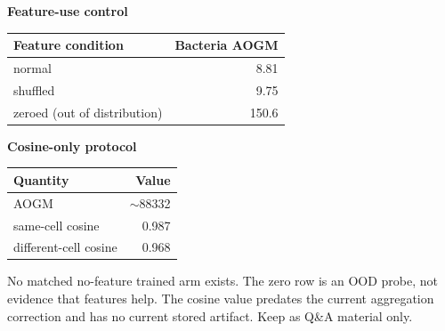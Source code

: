 \begin{frame}
  \centering
  \begin{minipage}{0.46\textwidth}
    \centering
    {\small\textbf{Feature-use control}}\par\vspace{2mm}
    \scriptsize
    \renewcommand{\arraystretch}{1.2}
    \begin{tabular}{@{}lr@{}}
      \toprule
      Feature condition & Bacteria AOGM\\
      \midrule
      normal & 8.81\\
      shuffled & 9.75\\
      zeroed (out of distribution) & 150.6\\
      \bottomrule
    \end{tabular}
  \end{minipage}\hfill
  \begin{minipage}{0.46\textwidth}
    \centering
    {\small\textbf{Cosine-only protocol}}\par\vspace{2mm}
    \scriptsize
    \renewcommand{\arraystretch}{1.2}
    \begin{tabular}{@{}lr@{}}
      \toprule
      Quantity & Value\\
      \midrule
      AOGM & $\sim$88332\\
      same-cell cosine & 0.987\\
      different-cell cosine & 0.968\\
      \bottomrule
    \end{tabular}
  \end{minipage}
  \vspace{4mm}

  {\footnotesize No matched no-feature trained arm exists. The zero row is an OOD probe, not evidence that features help. The cosine value predates the current aggregation correction and has no current stored artifact. Keep as Q\&A material only.}
\end{frame}

\begin{frame}[allowframebreaks]
  \vspace*{6mm}
  \begingroup
  \tiny
  \renewcommand*{\bibfont}{\tiny}
  \setlength{\bibitemsep}{0pt}
  \setlength{\bibhang}{0pt}
  \printbibliography[heading=none]
  \endgroup
\end{frame}
